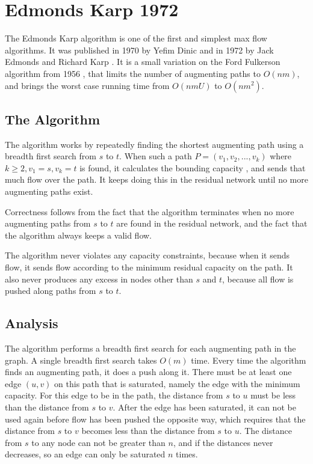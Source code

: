 \section{Edmonds Karp 1972}
\label{EK1972Section}

The Edmonds Karp algorithm is one of the first and simplest max flow algorithms. 
It was published in 1970 by Yefim Dinic \cite{dinic1970} and in 1972 by Jack Edmonds and Richard Karp \cite{Edmonds1972}.
It is a small variation on the Ford Fulkerson algorithm from 1956 \cite{FordFulkerson}, that limits the number of augmenting paths to $O(nm)$, and brings the worst case running time from $O(nmU)$ to $O(nm^2)$.

\subsection{The Algorithm}

The algorithm works by repeatedly finding the shortest augmenting path using a breadth first search from $s$ to $t$.
When such a path $P=(v_1, v_2, ..., v_k)$ where $k\geq 2, v_1 = s, v_k = t$ is found, it calculates the bounding capacity , 
and sends that much flow over the path.
It keeps doing this in the residual network until no more augmenting paths exist.

Correctness follows from the fact that the algorithm terminates when no more augmenting paths from $s$ to $t$ are found in the residual network, 
and the fact that the algorithm always keeps a valid flow.

The algorithm never violates any capacity constraints, because when it sends flow, it sends flow according to the minimum residual capacity on the path.
It also never produces any excess in nodes other than $s$ and $t$, because all flow is pushed along paths from $s$ to $t$.

\subsection{Analysis}
\label{EK1972Analysis}

The algorithm performs a breadth first search for each augmenting path in the graph. A single breadth first search takes $O(m)$ time.
Every time the algorithm finds an augmenting path, it does a push along it. 
There must be at least one edge $(u, v)$ on this path that is saturated, namely the edge with the minimum capacity.
For this edge to be in the path, the distance from $s$ to $u$ must be less than the distance from $s$ to $v$.
After the edge has been saturated, it can not be used again before flow has been pushed the opposite way, 
which requires that the distance from $s$ to $v$ becomes less than the distance from $s$ to $u$.
The distance from $s$ to any node can not be greater than $n$, and if the distances never decreases, so an edge can only be saturated $n$ times.

